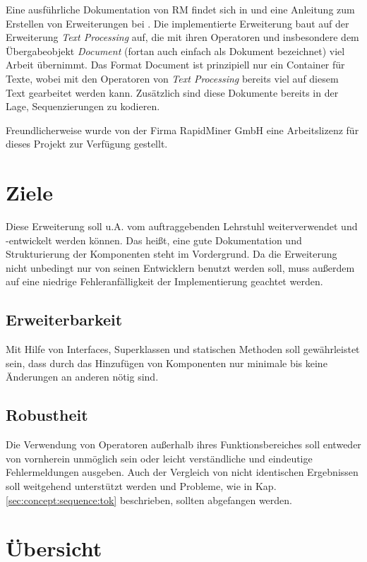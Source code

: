 Eine ausführliche Dokumentation von RM findet sich in \cite{rmdoc} und eine Anleitung zum Erstellen von Erweiterungen bei \cite{rmext}.
 Die implementierte Erweiterung baut auf der Erweiterung \textit{Text Processing} auf, die mit ihren Operatoren und insbesondere dem Übergabeobjekt \textit{Document} (fortan auch einfach als Dokument bezeichnet) viel Arbeit übernimmt. Das Format Document ist prinzipiell nur ein Container für Texte, wobei mit den Operatoren von \textit{Text Processing} bereits viel auf diesem Text gearbeitet werden kann. Zusätzlich sind diese Dokumente bereits in der Lage, Sequenzierungen zu kodieren.
 
 Freundlicherweise wurde von der Firma RapidMiner GmbH eine Arbeitslizenz für dieses Projekt zur Verfügung gestellt.

\section{Ziele}
\label{sec:impl:aims}
Diese Erweiterung soll u.A. vom auftraggebenden Lehrstuhl weiterverwendet und -entwickelt werden können. Das heißt, eine gute Dokumentation und Strukturierung der Komponenten steht im Vordergrund. Da die Erweiterung nicht unbedingt nur von seinen Entwicklern benutzt werden soll, muss außerdem auf eine niedrige Fehleranfälligkeit der Implementierung geachtet werden.
\subsection{Erweiterbarkeit}
Mit Hilfe von Interfaces, Superklassen und statischen Methoden soll gewährleistet sein, dass durch das Hinzufügen von Komponenten nur minimale bis keine Änderungen an anderen nötig sind.
\subsection{Robustheit}
Die Verwendung von Operatoren außerhalb ihres Funktionsbereiches soll entweder von vornherein unmöglich sein oder leicht verständliche und eindeutige Fehlermeldungen ausgeben. Auch der Vergleich von nicht identischen Ergebnissen soll weitgehend unterstützt werden und Probleme, wie in Kap. \ref{sec:concept:sequence:tok} beschrieben, sollten abgefangen werden.

\section{Übersicht}
\label{sec:impl:structure}

